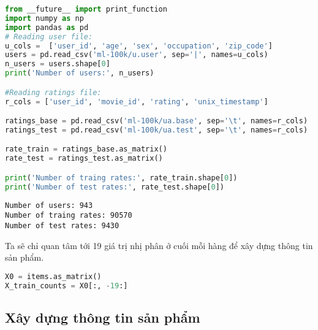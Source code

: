 

\begin{lstlisting}[language=Python]
from __future__ import print_function
import numpy as np
import pandas as pd
# Reading user file:
u_cols =  ['user_id', 'age', 'sex', 'occupation', 'zip_code']
users = pd.read_csv('ml-100k/u.user', sep='|', names=u_cols)
n_users = users.shape[0]
print('Number of users:', n_users)

#Reading ratings file:
r_cols = ['user_id', 'movie_id', 'rating', 'unix_timestamp']

ratings_base = pd.read_csv('ml-100k/ua.base', sep='\t', names=r_cols)
ratings_test = pd.read_csv('ml-100k/ua.test', sep='\t', names=r_cols)

rate_train = ratings_base.as_matrix()
rate_test = ratings_test.as_matrix()

print('Number of traing rates:', rate_train.shape[0])
print('Number of test rates:', rate_test.shape[0])
\end{lstlisting}
\kq
\begin{lstlisting}
Number of users: 943
Number of traing rates: 90570
Number of test rates: 9430
\end{lstlisting}
Ta sẽ chỉ quan tâm tới 19 giá trị nhị phân ở cuối mỗi hàng để xây dựng thông tin sản phẩm.
\begin{lstlisting}[language=Python]
X0 = items.as_matrix()
X_train_counts = X0[:, -19:]
\end{lstlisting}

\subsection{Xây dựng thông tin sản phẩm}

